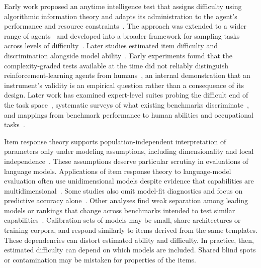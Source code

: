 \documentclass[acmsmall,screen,review,anonymous]{acmart}
\begin{document}
Early work proposed an anytime intelligence test that assigns difficulty using algorithmic information theory and adapts its administration to the agent's performance and resource constraints~\citep{HERNANDEZORALLO20101508}.
%
The approach was extended to a wider range of agents~\citep{HERNANDEZORALLO201450} and developed into a broader framework for sampling tasks across levels of difficulty~\citep{hernandezorallo2017}.
%
Later studies estimated item difficulty and discrimination alongside model ability~\citep{
MARTINEZPLUMED201918}.
%
Early experiments found that the complexity-graded tests available at the time did not reliably distinguish reinforcement-learning agents from humans~\citep{10.1007/978-3-642-22887-2_13}, an internal demonstration that an instrument's validity is an empirical question rather than a consequence of its design.
%
Later work has examined expert-level suites probing the difficult end of the task space~\citep{HLE2026}, systematic surveys of what existing benchmarks discriminate~\citep{srivastava2023beyond}, and mappings from benchmark performance to human abilities and occupational tasks~\citep{10.1613/jair.1.12647}.


Item response theory supports population-independent interpretation of parameters only under modeling assumptions, including dimensionality and local independence~\citep{embretson2000irt,doi:10.1177/0013164404273942}.
%
These assumptions deserve particular scrutiny in evaluations of language models.
%
Applications of item response theory to language-model evaluation often use unidimensional models despite evidence that capabilities are multidimensional~\citep{ye2026largelanguagemodelpsychometrics, Ravenda2025RethinkingPT}.
%
Some studies also omit model-fit diagnostics and focus on predictive accuracy alone~\citep{li2026adaptive}.
%
Other analyses find weak separation among leading models or rankings that change across benchmarks intended to test similar capabilities~\citep{10.1609/aaai.v40i41.40814}.
%
Calibration sets of models may be small, share architectures or training corpora, and respond similarly to items derived from the same templates.
%
These dependencies can distort estimated ability and difficulty.
%
In practice, then, estimated difficulty can depend on which models are included.
%
Shared blind spots or contamination may be mistaken for properties of the items.
\end{document}
